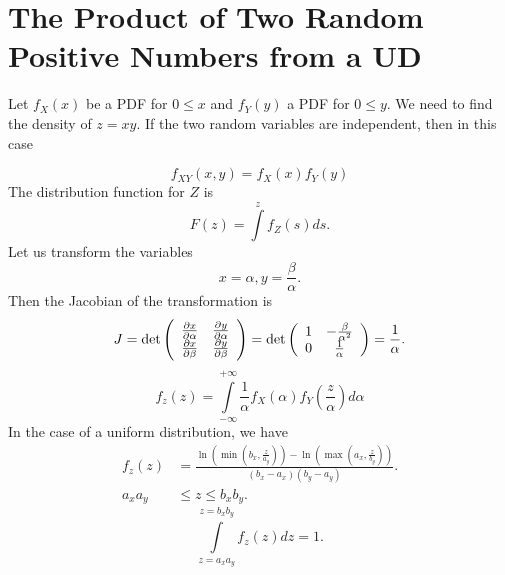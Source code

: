 \documentclass[titlepage,fleqn]{article}%
\begin{document}
\section{The Product of Two Random Positive Numbers from a UD}%

\label{P2RNUD}%


Let $f_{X}(x)$ be a PDF for $0\leq x$ and $f_{Y}(y)$ a PDF for $0\leq y$. We
need to find the density of $z=xy$. If the two random variables are
independent, then in this case%

\[
f_{XY}(x,y)=f_{X}(x)f_{Y}(y)
\]
The distribution function for $Z$ is%
\[
F(z)=%
{\displaystyle\int\limits^{z}}
f_{Z}(s)ds.
\]
Let us transform the variables%
\[
x=\alpha,y=\frac{\beta}{\alpha}.
\]
Then the Jacobian of the transformation is%
\[
J=\det\left(
\begin{array}
[c]{cc}%
\frac{\partial x}{\partial\alpha} & \frac{\partial y}{\partial\alpha}\\
\frac{\partial x}{\partial\beta} & \frac{\partial y}{\partial\beta}%
\end{array}
\right)  =\det\left(
\begin{array}
[c]{cc}%
1 & -\frac{\beta}{\alpha^{2}}\\
0 & \frac{1}{\alpha}%
\end{array}
\right)  =\frac{1}{\alpha}.
\]%
\[
f_{z}(z)=%
{\displaystyle\int\limits_{-\infty}^{+\infty}}
\frac{1}{\alpha}f_{X}(\alpha)f_{Y}\left(  \frac{z}{\alpha}\right)  d\alpha
\]
In the case of a uniform distribution, we have%
\begin{align*}
f_{z}(z)  &  =\frac{\ln\left(  \min\left(  b_{x},\frac{z}{a_{y}}\right)
\right)  -\ln\left(  \max\left(  a_{x},\frac{z}{b_{y}}\right)  \right)
}{\left(  b_{x}-a_{x}\right)  \left(  b_{y}-a_{y}\right)  }.\\
a_{x}a_{y}  &  \leq z\leq b_{x}b_{y}.
\end{align*}%
\[%
{\displaystyle\int\limits_{z=a_{x}a_{y}}^{z=b_{x}b_{y}}}
f_{z}(z)dz=1.
\]
\end{document}
